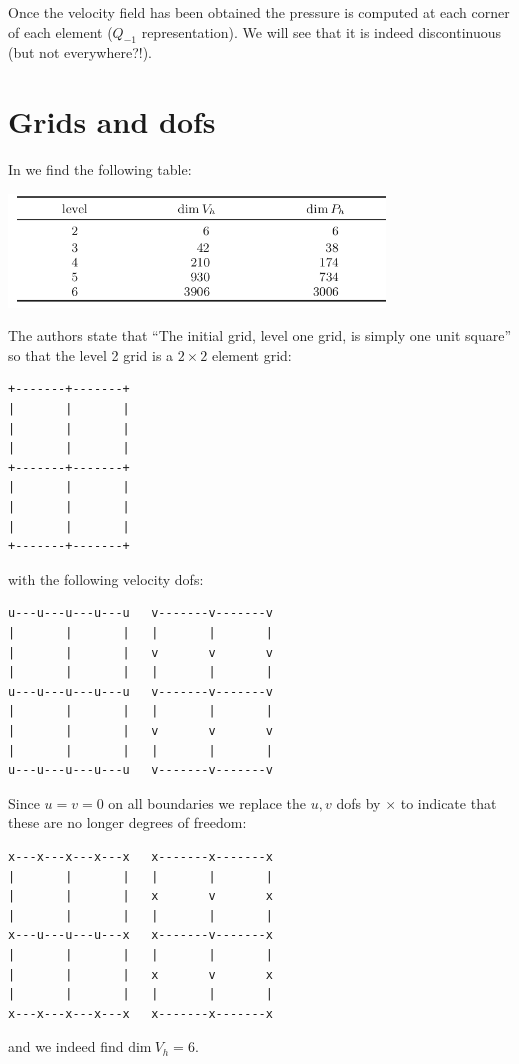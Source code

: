 Once the velocity field has been obtained the pressure is computed 
at each corner of each element ($Q_{-1}$ representation).
We will see that it is indeed discontinuous (but not everywhere?!).


\newpage
\section*{Grids and dofs}

In \textcite{huzh11} we find the following table:

\begin{center}
\includegraphics[width=10cm]{python_codes/fieldstone_161/images/dofs}
\end{center}

The authors state that ``The initial grid, level one grid, is simply one unit square''
so that the level 2 grid is a $2\times 2$ element grid:
\begin{verbatim}
+-------+-------+
|       |       |
|       |       |
|       |       |
+-------+-------+
|       |       |
|       |       |
|       |       |
+-------+-------+
\end{verbatim}
with the following velocity dofs:
\begin{verbatim}
u---u---u---u---u   v-------v-------v
|       |       |   |       |       |
|       |       |   v       v       v
|       |       |   |       |       |
u---u---u---u---u   v-------v-------v
|       |       |   |       |       |
|       |       |   v       v       v
|       |       |   |       |       |
u---u---u---u---u   v-------v-------v
\end{verbatim}
Since $u=v=0$ on all boundaries we replace the $u,v$ dofs by $\times$
to indicate that these are no longer degrees of freedom:
\begin{verbatim}
x---x---x---x---x   x-------x-------x
|       |       |   |       |       |
|       |       |   x       v       x
|       |       |   |       |       |
x---u---u---u---x   x-------v-------x
|       |       |   |       |       |
|       |       |   x       v       x
|       |       |   |       |       |
x---x---x---x---x   x-------x-------x
\end{verbatim}
and we indeed find $\text{dim}~V_h=6$. 

